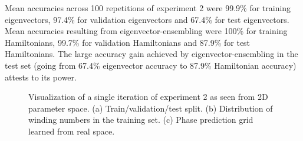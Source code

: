 \documentclass[fleqn,10pt]{wlscirep}
\begin{document}
Mean accuracies across 100 repetitions of experiment 2 were 99.9\% for training eigenvectors, 97.4\% for validation eigenvectors and 67.4\% for test eigenvectors. Mean accuracies resulting from eigenvector-ensembling were 100\% for training Hamiltonians, 99.7\% for validation Hamiltonians and 87.9\% for test Hamiltonians. The large accuracy gain achieved by eigenvector-ensembling in the test set (going from 67.4\% eigenvector accuracy to 87.9\% Hamiltonian accuracy) attests to its power.

\begin{figure}
\centering
{}\quad
{}
\caption{Visualization of a single iteration of experiment 2 as seen from 2D parameter space. (a) Train/validation/test split. (b) Distribution of winding numbers in the training set. (c) Phase prediction grid learned from real space.}
\label{figexp2_exp}
\end{figure}
\end{document}
